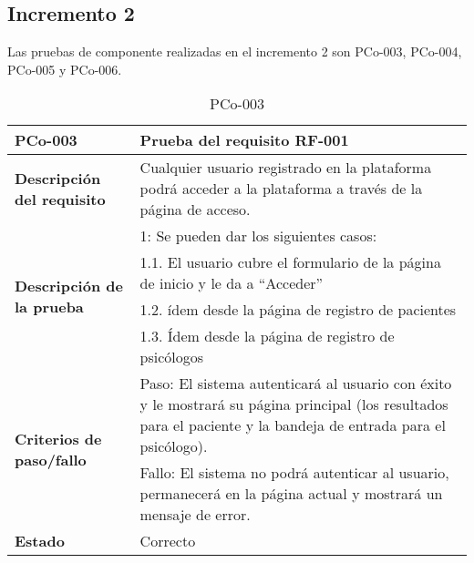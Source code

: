 \subsection{Incremento 2}

Las pruebas de componente realizadas en el incremento 2 son PCo-003, PCo-004, PCo-005 y PCo-006.

\begin{table}[htpb]
\centering
\begin{tabularx}{\textwidth}{|l|X|}
\hline
\rowcolor[gray]{0.9}\textbf{PCo-003}                                     & \textbf{Prueba del requisito RF-001}                                                                                                                            \\ \hline
\textbf{Descripción del requisito}                 & Cualquier usuario registrado en la plataforma podrá acceder a la plataforma a través de la página de acceso.                                                    \\ \hline
\multirow{4}{*}{\textbf{Descripción de la prueba}} & 1: Se pueden dar los siguientes casos:                                                                                                                          \\ \cline{2-2} 
                                                   & 1.1. El usuario cubre el formulario de la página de inicio y le da a ``Acceder''
\\ \cline{2-2} 
                                                   & 1.2. ídem desde la página de registro de pacientes                                                                                                              \\ \cline{2-2} 
                                                   & 1.3. Ídem desde la página de registro de psicólogos                                                                                                             \\ \hline
\multirow{2}{*}{\textbf{Criterios de paso/fallo}}  & Paso: El sistema autenticará al usuario con éxito y le mostrará su página principal (los resultados para el paciente y la bandeja de entrada para el psicólogo). \\ \cline{2-2} 
                                                   & Fallo: El sistema no podrá autenticar al usuario, permanecerá en la página actual y mostrará un mensaje de error.                                               \\ \hline
\textbf{Estado}                                    & Correcto                                                                                                                                                        \\ \hline
\end{tabularx}
\caption{PCo-003}
\end{table}


